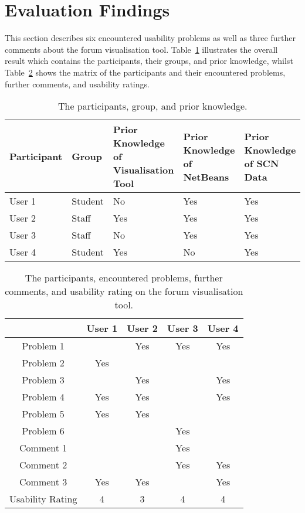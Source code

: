 \section{Evaluation Findings}

This section describes six encountered usability problems as well as three further comments about the forum visualisation tool. Table~\ref{tab:evaluation_01} illustrates the overall result which contains the participants, their groups, and prior knowledge, whilst Table~\ref{tab:evaluation_02} shows the matrix of the participants and their encountered problems, further comments, and usability ratings.

\begin{table}
	\centering
		\begin{tabular}{ | l | l | p{3cm} | p{3cm} | p{3cm} |}
			\hline
    Participant & Group & Prior Knowledge of Visualisation Tool & Prior Knowledge of NetBeans & Prior Knowledge of SCN Data \\ \hline
    User 1 & Student & No & Yes & Yes \\ \hline
    User 2 & Staff & Yes & Yes & Yes \\ \hline
    User 3 & Staff & No & Yes & Yes \\ \hline
    User 4 & Student & Yes & No & Yes \\
    \hline
		\end{tabular}
	\caption{The participants, group, and prior knowledge.}
	\label{tab:evaluation_01}
\end{table}

\begin{table}
	\centering
		\begin{tabular}{ | c | c | c | c | c |}
			\hline
     & User 1 & User 2 & User 3 & User 4 \\ \hline
    Problem 1 &  & Yes & Yes & Yes \\ \hline
    Problem 2 & Yes &  &  & \\ \hline
    Problem 3 &  & Yes &  & Yes \\ \hline
    Problem 4 & Yes & Yes &  & Yes \\ \hline
    Problem 5 & Yes & Yes &  & \\ \hline
    Problem 6 &  &  & Yes &  \\ \hline
    Comment 1 &  &  & Yes &  \\ \hline
    Comment 2 &  &  & Yes & Yes \\ \hline
    Comment 3 & Yes & Yes &  & Yes \\ \hline
    Usability Rating & 4 & 3 & 4 & 4 \\
    \hline    
		\end{tabular}
	\caption{The participants, encountered problems, further comments, and usability rating on the forum visualisation tool.}
	\label{tab:evaluation_02}
\end{table}

